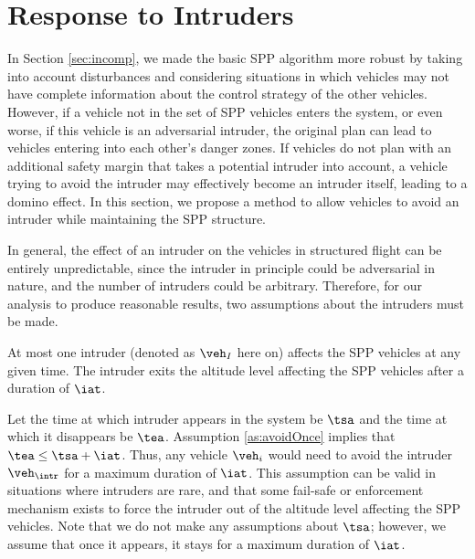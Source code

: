 \section{Response to Intruders \label{sec:intruder}}

In Section \ref{sec:incomp}, we made the basic SPP algorithm more robust by taking into account disturbances and considering situations in which vehicles may not have complete information about the control strategy of the other vehicles. However, if a vehicle not in the set of SPP vehicles enters the system, or even worse, if this vehicle is an adversarial intruder, the original plan can lead to vehicles entering into each other's danger zones. If vehicles do not plan with an additional safety margin that takes a potential intruder into account, a vehicle trying to avoid the intruder may effectively become an intruder itself, leading to a domino effect. In this section, we propose a method to allow vehicles to avoid an intruder while maintaining the SPP structure.

In general, the effect of an intruder on the vehicles in structured flight can be entirely unpredictable, since the intruder in principle could be adversarial in nature, and the number of intruders could be arbitrary. Therefore, for our analysis to produce reasonable results, two assumptions about the intruders must be made.

\begin{assumption}
\label{as:avoidOnce}
At most one intruder (denoted as $\veh_I$ here on) affects the SPP vehicles at any given time. The intruder exits the altitude level affecting the SPP vehicles after a duration of $\iat$. 
\end{assumption}

Let the time at which intruder appears in the system be $\tsa$ and the time at which it disappears be $\tea$. Assumption \ref{as:avoidOnce} implies that $\tea \leq \tsa + \iat$. Thus, any vehicle $\veh_i$ would need to avoid the intruder $\veh_{\intr}$ for a maximum duration of $\iat$. This assumption can be valid in situations where intruders are rare, and that some fail-safe or enforcement mechanism exists to force the intruder out of the altitude level affecting the SPP vehicles. Note that we do not make any assumptions about $\tsa$; however, we assume that once it appears, it stays for a maximum duration of $\iat$.

